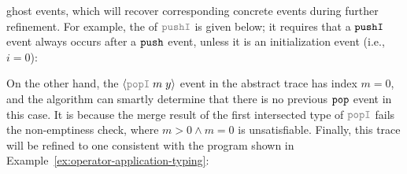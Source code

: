 \begin{example}
ghost events, which will recover corresponding concrete events during
further refinement.  For example, the \tyName{} of $\effGray{pushI}$
is given below; it requires that a $\boldsymbol{{\tt pushI}}$ event always occurs
after a $\boldsymbol{{\tt push}}$ event, unless it is an initialization event
(i.e., $i = 0$): %
\vspace{-.4cm} \par{}\vspace{-.4cm} \par\nobreak\noindent
On the other hand, the $\msgAGray{popI}{m\;y}$ event in the abstract trace has index $m = 0$, and the algorithm can smartly determine that there is no previous $\boldsymbol{{\tt pop}}$ event in this case. It is because the merge result of the first intersected type of $\effGray{popI}$ fails the non-emptiness check, where $m > 0 \land m = 0$ is unsatisfiable. Finally, this trace will be refined to one consistent with the program shown in Example~\ref{ex:operator-application-typing}:
\vspace{-.4cm} \par{}\vspace{-.6cm} \par\nobreak\noindent
\end{example}

